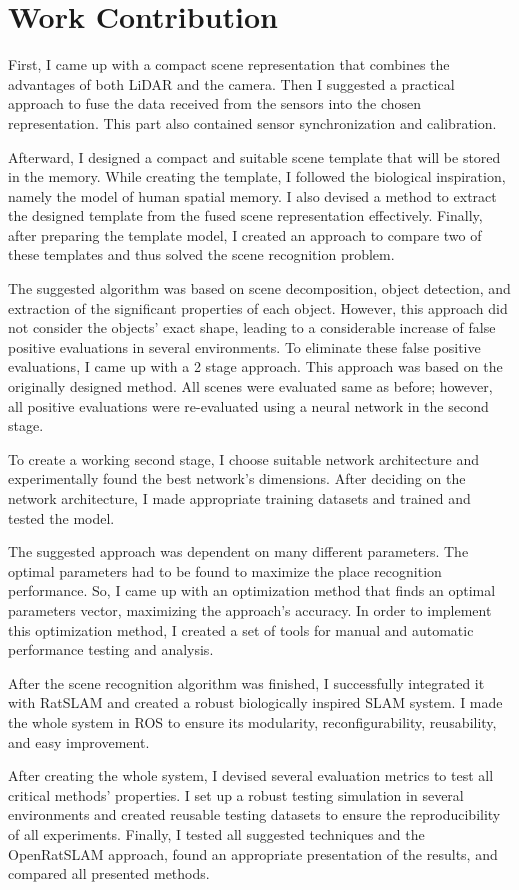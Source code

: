 \section{Work Contribution}\label{section:workContribution}

First, I came up with a compact scene representation that combines the advantages of both LiDAR and the camera. Then I suggested a practical approach to fuse the data received from the sensors into the chosen representation. This part also contained sensor synchronization and calibration.\par
Afterward, I designed a compact and suitable scene template that will be stored in the memory. While creating the template, I followed the biological inspiration, namely the model of human spatial memory. I also devised a method to extract the designed template from the fused scene representation effectively. Finally, after preparing the template model, I created an approach to compare two of these templates and thus solved the scene recognition problem.\par
The suggested algorithm was based on scene decomposition, object detection, and extraction of the significant properties of each object. However, this approach did not consider the objects' exact shape, leading to a considerable increase of false positive evaluations in several environments. To eliminate these false positive evaluations, I came up with a 2 stage approach. This approach was based on the originally designed method. All scenes were evaluated same as before; however, all positive evaluations were re-evaluated using a neural network in the second stage.\par
To create a working second stage, I choose suitable network architecture and experimentally found the best network's dimensions. After deciding on the network architecture, I made appropriate training datasets and trained and tested the model.\par
The suggested approach was dependent on many different parameters. The optimal parameters had to be found to maximize the place recognition performance. So, I came up with an optimization method that finds an optimal parameters vector, maximizing the approach's accuracy. In order to implement this optimization method, I created a set of tools for manual and automatic performance testing and analysis.\par
After the scene recognition algorithm was finished, I successfully integrated it with RatSLAM and created a robust biologically inspired SLAM system. I made the whole system in ROS to ensure its modularity, reconfigurability, reusability, and easy improvement.\par
After creating the whole system, I devised several evaluation metrics to test all critical methods' properties. I set up a robust testing simulation in several environments and created reusable testing datasets to ensure the reproducibility of all experiments. Finally, I tested all suggested techniques and the OpenRatSLAM approach, found an appropriate presentation of the results, and compared all presented methods.

